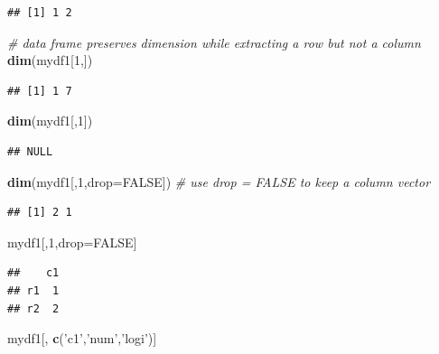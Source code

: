 \documentclass[]{book}
\newenvironment{Shaded}{\begin{snugshade}}{\end{snugshade}}
\newcommand{\KeywordTok}[1]{\textcolor[rgb]{0.13,0.29,0.53}{\textbf{{#1}}}}
\newcommand{\DataTypeTok}[1]{\textcolor[rgb]{0.13,0.29,0.53}{{#1}}}
\newcommand{\DecValTok}[1]{\textcolor[rgb]{0.00,0.00,0.81}{{#1}}}
\newcommand{\StringTok}[1]{\textcolor[rgb]{0.31,0.60,0.02}{{#1}}}
\newcommand{\CommentTok}[1]{\textcolor[rgb]{0.56,0.35,0.01}{\textit{{#1}}}}
\newcommand{\OtherTok}[1]{\textcolor[rgb]{0.56,0.35,0.01}{{#1}}}
\newcommand{\NormalTok}[1]{{#1}}
\theoremstyle{definition}
\theoremstyle{definition}
\theoremstyle{remark}
\begin{document}
\begin{verbatim}
## [1] 1 2
\end{verbatim}

\begin{Shaded}
\begin{Highlighting}[]
\CommentTok{# data frame preserves dimension while extracting a row but not a column}
\KeywordTok{dim}\NormalTok{(mydf1[}\DecValTok{1}\NormalTok{,])  }
\end{Highlighting}
\end{Shaded}

\begin{verbatim}
## [1] 1 7
\end{verbatim}

\begin{Shaded}
\begin{Highlighting}[]
\KeywordTok{dim}\NormalTok{(mydf1[,}\DecValTok{1}\NormalTok{])  }
\end{Highlighting}
\end{Shaded}

\begin{verbatim}
## NULL
\end{verbatim}

\begin{Shaded}
\begin{Highlighting}[]
\KeywordTok{dim}\NormalTok{(mydf1[,}\DecValTok{1}\NormalTok{,}\DataTypeTok{drop=}\OtherTok{FALSE}\NormalTok{])   }\CommentTok{# use drop = FALSE to keep a column vector}
\end{Highlighting}
\end{Shaded}

\begin{verbatim}
## [1] 2 1
\end{verbatim}

\begin{Shaded}
\begin{Highlighting}[]
\NormalTok{mydf1[,}\DecValTok{1}\NormalTok{,drop=}\OtherTok{FALSE}\NormalTok{]}
\end{Highlighting}
\end{Shaded}

\begin{verbatim}
##    c1
## r1  1
## r2  2
\end{verbatim}

\begin{Shaded}
\begin{Highlighting}[]
\NormalTok{mydf1[, }\KeywordTok{c}\NormalTok{(}\StringTok{'c1'}\NormalTok{,}\StringTok{'num'}\NormalTok{,}\StringTok{'logi'}\NormalTok{)]}
\end{Highlighting}
\end{Shaded}
\end{document}
